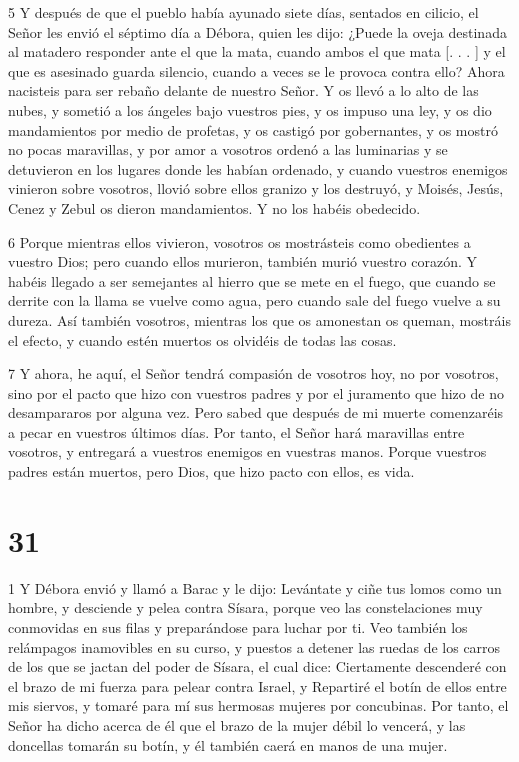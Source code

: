 \par 5 Y después de que el pueblo había ayunado siete días, sentados en cilicio, el Señor les envió el séptimo día a Débora, quien les dijo: ¿Puede la oveja destinada al matadero responder ante el que la mata, cuando ambos el que mata [. . . ] y el que es asesinado guarda silencio, cuando a veces se le provoca contra ello? Ahora nacisteis para ser rebaño delante de nuestro Señor. Y os llevó a lo alto de las nubes, y sometió a los ángeles bajo vuestros pies, y os impuso una ley, y os dio mandamientos por medio de profetas, y os castigó por gobernantes, y os mostró no pocas maravillas, y por amor a vosotros ordenó a las luminarias y se detuvieron en los lugares donde les habían ordenado, y cuando vuestros enemigos vinieron sobre vosotros, llovió sobre ellos granizo y los destruyó, y Moisés, Jesús, Cenez y Zebul os dieron mandamientos. Y no los habéis obedecido.

\par 6 Porque mientras ellos vivieron, vosotros os mostrásteis como obedientes a vuestro Dios; pero cuando ellos murieron, también murió vuestro corazón. Y habéis llegado a ser semejantes al hierro que se mete en el fuego, que cuando se derrite con la llama se vuelve como agua, pero cuando sale del fuego vuelve a su dureza. Así también vosotros, mientras los que os amonestan os queman, mostráis el efecto, y cuando estén muertos os olvidéis de todas las cosas.

\par 7 Y ahora, he aquí, el Señor tendrá compasión de vosotros hoy, no por vosotros, sino por el pacto que hizo con vuestros padres y por el juramento que hizo de no desampararos por alguna vez. Pero sabed que después de mi muerte comenzaréis a pecar en vuestros últimos días. Por tanto, el Señor hará maravillas entre vosotros, y entregará a vuestros enemigos en vuestras manos. Porque vuestros padres están muertos, pero Dios, que hizo pacto con ellos, es vida.

\chapter{31}

\par 1 Y Débora envió y llamó a Barac y le dijo: Levántate y ciñe tus lomos como un hombre, y desciende y pelea contra Sísara, porque veo las constelaciones muy conmovidas en sus filas y preparándose para luchar por ti. Veo también los relámpagos inamovibles en su curso, y puestos a detener las ruedas de los carros de los que se jactan del poder de Sísara, el cual dice: Ciertamente descenderé con el brazo de mi fuerza para pelear contra Israel, y Repartiré el botín de ellos entre mis siervos, y tomaré para mí sus hermosas mujeres por concubinas. Por tanto, el Señor ha dicho acerca de él que el brazo de la mujer débil lo vencerá, y las doncellas tomarán su botín, y él también caerá en manos de una mujer.

